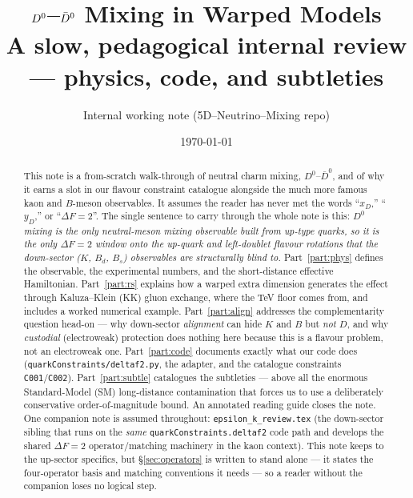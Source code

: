 \documentclass[11pt]{article}
\title{\bf $\Dz$--$\Dzbar$ Mixing in Warped Models\\[4pt]
\large A slow, pedagogical internal review --- physics, code, and subtleties}
\author{Internal working note (5D--Neutrino--Mixing repo)}
\date{\today}
\newcommand{\code}[1]{\texttt{#1}}
\newcommand{\Dz}{D^0}
\newcommand{\Dzbar}{\bar D^0}
\newcommand{\xD}{x_D}
\newcommand{\yD}{y_D}
\theoremstyle{definition}
\begin{document}
\maketitle

\begin{abstract}
\noindent
This note is a from-scratch walk-through of neutral charm mixing, $\Dz$--$\Dzbar$,
and of why it earns a slot in our flavour constraint catalogue alongside the
much more famous kaon and $B$-meson observables. It assumes the reader has
never met the words ``$\xD$,'' ``$\yD$,'' or ``$\Delta F=2$''. The single
sentence to carry through the whole note is this: \emph{$\Dz$ mixing is the only
neutral-meson mixing observable built from up-type quarks, so it is the only
$\Delta F=2$ window onto the up-quark and left-doublet flavour rotations that
the down-sector ($K$, $B_d$, $B_s$) observables are structurally blind to.}
Part~\ref{part:phys} defines the observable, the experimental numbers, and the
short-distance effective Hamiltonian. Part~\ref{part:rs} explains how a warped
extra dimension generates the effect through Kaluza--Klein (KK) gluon exchange,
where the TeV floor comes from, and includes a worked numerical example.
Part~\ref{part:align} addresses the complementarity question head-on --- why
down-sector \emph{alignment} can hide $K$ and $B$ but \emph{not} $D$, and why
\emph{custodial} (electroweak) protection does nothing here because this is a
flavour problem, not an electroweak one. Part~\ref{part:code} documents exactly
what our code does (\code{quarkConstraints/deltaf2.py}, the adapter, and the
catalogue constraints \code{C001}/\code{C002}). Part~\ref{part:subtle}
catalogues the subtleties --- above all the enormous Standard-Model (SM)
long-distance contamination that forces us to use a deliberately conservative
order-of-magnitude bound. An annotated reading guide closes the note. One
companion note is assumed throughout: \code{epsilon\_k\_review.tex} (the
down-sector sibling that runs on the \emph{same} \code{quarkConstraints.deltaf2}
code path and develops the shared $\Delta F=2$ operator/matching machinery in
the kaon context). This note keeps to the up-sector specifics, but
\S\ref{sec:operators} is written to stand alone --- it states the four-operator
basis and matching conventions it needs --- so a reader without the companion
loses no logical step.
\end{abstract}

\tableofcontents

\end{document}
